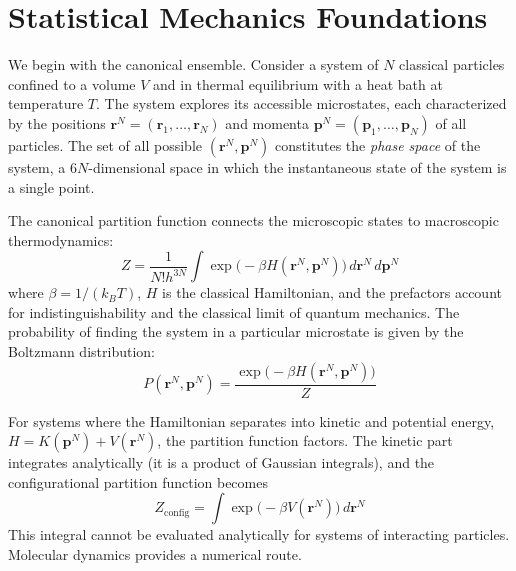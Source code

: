 \section{Statistical Mechanics Foundations}
\label{sec:md-stat-mech}

We begin with the canonical ensemble. Consider a system of $N$ classical particles confined to a volume $V$ and in thermal equilibrium with a heat bath at temperature $T$. The system explores its accessible microstates, each characterized by the positions $\mathbf{r}^N = (\mathbf{r}_1, \ldots, \mathbf{r}_N)$ and momenta $\mathbf{p}^N = (\mathbf{p}_1, \ldots, \mathbf{p}_N)$ of all particles. The set of all possible $(\mathbf{r}^N, \mathbf{p}^N)$ constitutes the \emph{phase space} of the system, a $6N$-dimensional space in which the instantaneous state of the system is a single point.

The canonical partition function connects the microscopic states to macroscopic thermodynamics:
\begin{equation}
\label{eq:partition-function}
Z = \frac{1}{N! h^{3N}} \int \exp\!\bigl(-\beta H(\mathbf{r}^N, \mathbf{p}^N)\bigr) \, d\mathbf{r}^N \, d\mathbf{p}^N
\end{equation}
where $\beta = 1/(k_B T)$, $H$ is the classical Hamiltonian, and the prefactors account for indistinguishability and the classical limit of quantum mechanics. The probability of finding the system in a particular microstate is given by the Boltzmann distribution:
\begin{equation}
\label{eq:boltzmann}
P(\mathbf{r}^N, \mathbf{p}^N) = \frac{\exp\!\bigl(-\beta H(\mathbf{r}^N, \mathbf{p}^N)\bigr)}{Z}
\end{equation}

For systems where the Hamiltonian separates into kinetic and potential energy, $H = K(\mathbf{p}^N) + V(\mathbf{r}^N)$, the partition function factors. The kinetic part integrates analytically (it is a product of Gaussian integrals), and the configurational partition function becomes
\begin{equation}
\label{eq:config-partition}
Z_{\text{config}} = \int \exp\!\bigl(-\beta V(\mathbf{r}^N)\bigr) \, d\mathbf{r}^N
\end{equation}
This integral cannot be evaluated analytically for systems of interacting particles. Molecular dynamics provides a numerical route.

